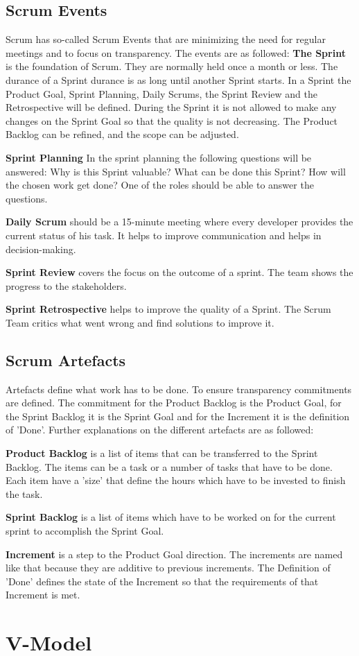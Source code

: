 \subsection{Scrum Events}
Scrum has so-called Scrum Events that are minimizing the need for regular meetings and to focus on transparency. The events are as followed:
\textbf{The Sprint} is the foundation of Scrum. They are normally held once a month or less. The durance of a Sprint durance is as long until another Sprint starts. In a Sprint the Product Goal, Sprint Planning, Daily Scrums, the Sprint Review and the Retrospective will be defined. During the Sprint it is not allowed to make any changes on the Sprint Goal so that the quality is not decreasing. The Product Backlog can be refined, and the scope can be adjusted. \cite{scrum_guide}

\textbf{Sprint Planning} In the sprint planning the following questions will be answered: Why is this Sprint valuable? What can be done this Sprint? How will the chosen work get done? One of the roles should be able to answer the questions. \cite{scrum_guide}

\textbf{Daily Scrum} should be a 15-minute meeting where every developer provides the current status of his task. It helps to improve communication and helps in decision-making. \cite{scrum_guide}

\textbf{Sprint Review} covers the focus on the outcome of a sprint. The team shows the progress to the stakeholders. \cite{scrum_guide}

\textbf{Sprint Retrospective} helps to improve the quality of a Sprint. The Scrum Team critics what went wrong and find solutions to improve it. \cite{scrum_guide}

\subsection{Scrum Artefacts}

Artefacts define what work has to be done. To ensure transparency commitments are defined. The commitment for the Product Backlog is the Product Goal, for the Sprint Backlog it is the Sprint Goal and for the Increment it is the definition of 'Done'. Further explanations on the different artefacts are as followed: \cite{scrum_guide}

\textbf{Product Backlog} is a list of items that can be transferred to the Sprint Backlog. The items can be a task or a number of tasks that have to be done. Each item have a 'size' that define the hours which have to be invested to finish the task. \cite{scrum_guide}

\textbf{Sprint Backlog} is a list of items which have to be worked on for the current sprint to accomplish the Sprint Goal. \cite{scrum_guide}

\textbf{Increment} is a step to the Product Goal direction. The increments are named like that because they are additive to previous increments. The Definition of 'Done' defines the state of the Increment so that the requirements of that Increment is met. \cite{scrum_guide}

\section{V-Model}
\lipsum[1]